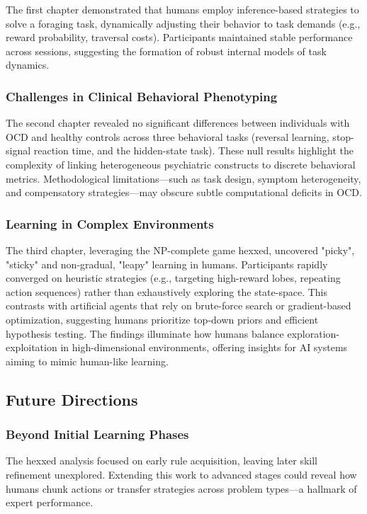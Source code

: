 \documentclass[11pt]{article}
\begin{document}
    The first chapter demonstrated that humans employ inference-based strategies to solve a foraging task, dynamically adjusting their behavior to task demands (e.g., reward probability, traversal costs). Participants maintained stable performance across sessions, suggesting the formation of robust internal models of task dynamics.

    \subsubsection{Challenges in Clinical Behavioral Phenotyping}
    The second chapter revealed no significant differences between individuals with OCD and healthy controls across three behavioral tasks (reversal learning, stop-signal reaction time, and the hidden-state task). These null results highlight the complexity of linking heterogeneous psychiatric constructs to discrete behavioral metrics. Methodological limitations—such as task design, symptom heterogeneity, and compensatory strategies—may obscure subtle computational deficits in OCD.

    \subsubsection{Learning in Complex Environments}
    The third chapter, leveraging the NP-complete game hexxed, uncovered "picky", "sticky" and non-gradual, "leapy" learning in humans. Participants rapidly converged on heuristic strategies (e.g., targeting high-reward lobes, repeating action sequences) rather than exhaustively exploring the state-space. This contrasts with artificial agents that rely on brute-force search or gradient-based optimization, suggesting humans prioritize top-down priors and efficient hypothesis testing. The findings illuminate how humans balance exploration-exploitation in high-dimensional environments, offering insights for AI systems aiming to mimic human-like learning.

\subsection{Future Directions}

    \subsubsection{Beyond Initial Learning Phases}
    The hexxed analysis focused on early rule acquisition, leaving later skill refinement unexplored. Extending this work to advanced stages could reveal how humans chunk actions or transfer strategies across problem types—a hallmark of expert performance.
\end{document}
